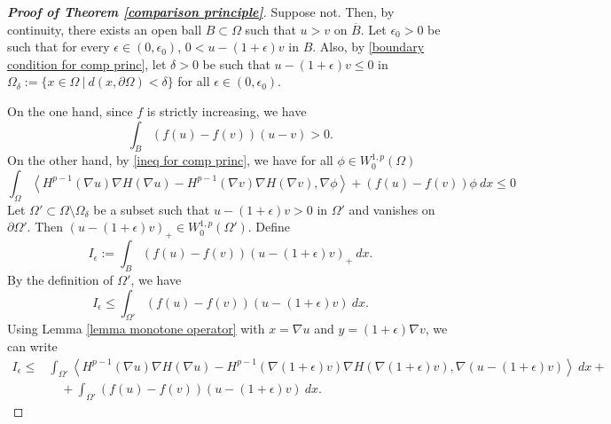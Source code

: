 \documentclass[11pt]{amsart}
\newcommand{\Fin}[1]{H^{p-1}(\nabla #1)\nabla H(\nabla #1)}
\numberwithin{equation}{section}
\begin{document}
    \begin{proof}[\textbf{Proof of Theorem \ref{comparison principle}}]
    Suppose not. Then, by continuity, there exists an open ball $B\subset\Omega$ such that $u>v$ on $\overline{B}$. Let $\epsilon_{0}>0$ be such that for every $\epsilon\in (0,\epsilon_{0})$, $0<u-(1+\epsilon)v$ in $B$. Also, by \eqref{boundary condition for comp princ}, let $\delta>0$ be such that $u-(1+\epsilon)v\leq 0$ in $\Omega_{\delta}:=\{x\in\Omega~|~ d(x,\partial\Omega)<\delta\}$ for all $\epsilon\in(0,\epsilon_{0})$. 

On the one hand, since $f$ is strictly increasing, we have
\begin{equation}\label{controduction ineq1}
    \int_{B}\left(f(u)-f(v)\right)(u-v)>0.
\end{equation}
On the other hand, by \eqref{ineq for comp princ}, we have for all $\phi\in W_{0}^{1,p}(\Omega)$
\begin{equation}\label{eqn weak comp ineq}
     \int_{\Omega}\left<\Fin{u}-\Fin{v}, \nabla \phi\right>+(f(u)-f(v))\phi \ dx\leq 0
\end{equation}
Let $\Omega'\subset \Omega\setminus\Omega_{\delta}$ be a subset such that $u-(1+\epsilon)v>0$ in $\Omega'$ and vanishes on $\partial\Omega'$. Then $(u-(1+\epsilon)v)_{+}\in W_{0}^{1,p}(\Omega')$. Define
\begin{equation*}
       I_{\epsilon}:=\int_{B}\left(f(u)-f(v)\right)(u-(1+\epsilon)v)_{+}\ dx.
\end{equation*}
By the definition of $\Omega'$, we have
\begin{equation*}
  I_{\epsilon}  \leq \int_{\Omega'} \left(f(u)-f(v)\right)(u-(1+\epsilon)v)\ dx.
\end{equation*}
Using Lemma \ref{lemma monotone operator} with $x=\nabla u$ and $y=(1+\epsilon)\nabla v$, we can write
\begin{equation*}
    \begin{split}
        I_{\epsilon}\leq  &\int_{\Omega'}\left<\Fin{u}-\Fin{(1+\epsilon)v}, \nabla (u-(1+\epsilon)v)\right>\ dx +\\
        &\quad +\int_{\Omega'} \left(f(u)-f(v)\right)(u-(1+\epsilon)v)\ dx.
    \end{split}
\end{equation*}


\end{proof}
\end{document}
